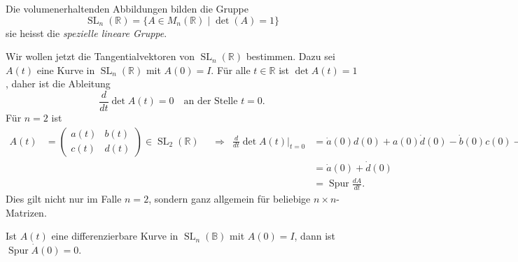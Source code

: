 \begin{definition}
Die volumenerhaltenden Abbildungen bilden die Gruppe
\[
\operatorname{SL}_n(\mathbb{R})
=
\{
A\in M_n(\mathbb{R})
\;|\;
\det (A) = 1
\}
\]
sie heisst die {\em spezielle lineare Gruppe}.
\end{definition}

Wir wollen jetzt die Tangentialvektoren von $\operatorname{SL}_n(\mathbb{R})$
bestimmen.
Dazu sei $A(t)$ eine Kurve in $\operatorname{SL}_n(\mathbb{R})$
mit $A(0)=I$.
Für alle $t\in\mathbb{R}$ ist $\det A(t)=1$, daher ist die Ableitung
\[
\frac{d}{dt} \det A(t) = 0
\quad\text{an der Stelle $t=0$.}
\]
Für $n=2$ ist
\begin{align*}
A(t)
&=
\begin{pmatrix}
a(t)&b(t)\\
c(t)&d(t)
\end{pmatrix}
\in
\operatorname{SL}_2(\mathbb{R})
&&\Rightarrow&
\frac{d}{dt}
\det A(t)\bigg|_{t=0}
&=
\dot{a}(0) d(0)+a(0)\dot{d}(0)
-
\dot{b}(0) c(0)-b(0)\dot{c}(0)
\\
&&&&
&=
\dot{a}(0) + \dot{d}(0)
\\
&&&&
&=
\operatorname{Spur}\frac{dA}{dt}.
\end{align*}
Dies gilt nicht nur im Falle $n=2$, sondern ganz allgemein für beliebige
$n\times n$-Matrizen.

\begin{satz}
Ist $A(t)$ eine differenzierbare Kurve in $\operatorname{SL}_n(\mathbb{B})$
mit $A(0)=I$, dann ist $\operatorname{Spur}\dot{A}(0)=0$.
\end{satz}

